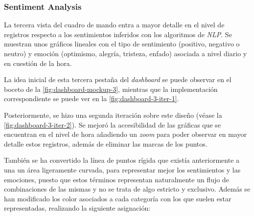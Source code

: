 

\subsubsection{Sentiment Analysis}

La tercera vista del cuadro de mando entra a mayor detalle en el nivel de registros respecto a los sentimientos inferidos con los algoritmos de \textit{NLP}. Se muestran unos gráficos lineales con el tipo de sentimiento (positivo, negativo o neutro) y emoción (optimismo, alegría, tristeza, enfado) asociada a nivel diario y en cuestión de la hora. 

La idea inicial de esta tercera pestaña del \textit{dashboard} se puede observar en el boceto de la \autoref{fig:dashboard-mockup-3}, mientras que la implementación correspondiente se puede ver en la \autoref{fig:dashboard-3-iter-1}.



Posteriormente, se hizo una segunda iteración sobre este diseño (véase la \autoref{fig:dashboard-3-iter-2}). Se mejoró la accesibilidad de las gráficas que se encuentran en el nivel de hora añadiendo un \textit{zoom} para poder observar en mayor detalle estos registros, además de eliminar las marcas de los puntos.

También se ha convertido la línea de puntos rígida que existía anteriormente a una un área ligeramente curvada, para representar mejor los sentimientos y las emociones, puesto que estos términos representan naturalmente un flujo de combinaciones de las mismas y no se trata de algo estricto y exclusivo. Además se han modificado los color asociados a cada categoría con los que suelen estar representadas, realizando la siguiente asignación:

